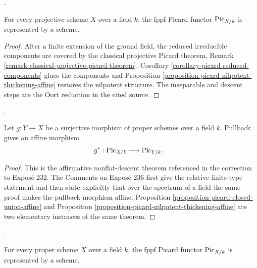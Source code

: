 \begin{lemma}
\label{corollary-picard-projective-field}
\begin{reference}
\cite[Expos\'e 232, Corollary 6.6, p. 159]{FGA}.
\end{reference}
For every projective scheme $X$ over a field $k$, the fppf Picard functor
$\mathrm{Pic}_{X/k}$ is represented by a scheme.
\end{lemma}

\begin{proof}
After a finite extension of the ground field, the reduced irreducible
components are covered by the classical projective Picard theorem, Remark
\ref{remark-classical-projective-picard-theorem}. Corollary
\ref{corollary-picard-reduced-components} glues the components and
Proposition \ref{proposition-picard-nilpotent-thickening-affine} restores
the nilpotent structure. The inseparable and descent steps are the Oort
reduction in the cited source.
\end{proof}

\begin{theorem}
\label{theorem-picard-pullback-proper-surjective-affine}
\begin{reference}
\cite[Expos\'e 232, Remark 6.7, p. 160 and correction, p. 303;
Comments on Expos\'e 236, final paragraph, p. 307]{FGA}.
\end{reference}
Let $g : Y \to X$ be a surjective morphism of proper schemes over a field
$k$. Pullback gives an affine morphism
\begin{equation}
\label{equation-picard-proper-surjective-pullback}
g^* : \mathrm{Pic}_{X/k} \longrightarrow \mathrm{Pic}_{Y/k}.
\end{equation}
\end{theorem}

\begin{proof}
This is the affirmative nonflat-descent theorem referenced in the correction
to Expos\'e 232. The Comments on Expos\'e 236 first give the relative
finite-type statement and then state explicitly that over the spectrum of a
field the same proof makes the pullback morphism affine. Proposition
\ref{proposition-picard-closed-union-affine} and Proposition
\ref{proposition-picard-nilpotent-thickening-affine} are two elementary
instances of the same theorem.
\end{proof}

\begin{theorem}[Murre]
\label{theorem-picard-proper-field}
\begin{reference}
\cite[Expos\'e 232, Remark 6.6, pp. 159--160 and correction,
p. 303]{FGA}.
\end{reference}
For every proper scheme $X$ over a field $k$, the fppf Picard functor
$\mathrm{Pic}_{X/k}$ is represented by a scheme.
\end{theorem}

